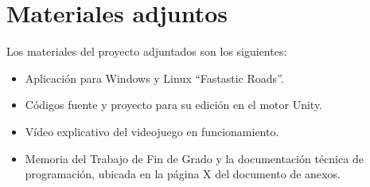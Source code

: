 \section{Materiales adjuntos}

Los materiales del proyecto adjuntados son los siguientes:

\begin{itemize}
\tightlist
	\item Aplicación para Windows y Linux ``Fastastic Roads''.
	\item Códigos fuente y proyecto para su edición en el motor Unity.
	\item Vídeo explicativo del videojuego en funcionamiento.
	\item Memoria del Trabajo de Fin de Grado y la documentación técnica de programación, ubicada en la página X del documento de anexos.
\end{itemize}